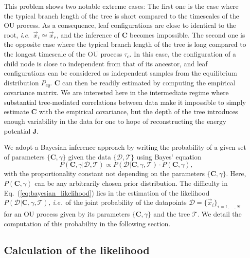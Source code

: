 \documentclass[preprint,amsmath,amssymb,superscriptaddress,showpacs,pre]{revtex4-1}
\newcommand{\ie}{\emph{i.e.}}
\def\vx{\vec x}
\begin{document}
This problem shows two notable extreme cases: 
The first one is the case where the typical branch length of the tree is short compared to the timescales of the OU process.
As a consequence, leaf configurations are close to identical to the root, \ie~$\vx_i\simeq\vx_r$, and the inference of $\bm C$ becomes impossible. 
The second one is the opposite case where the typical branch length of the tree is long compared to the longest timescale of the OU process $\tau_c$.
In this case, the configuration of a child node is close to independent from that of its ancestor, and leaf configurations can be considered as independent samples from the equilibrium distribution $P_{eq}$.
$\bm C$ can then be readily estimated by computing the empirical covariance matrix. 
We are interested here in the intermediate regime where substantial tree-mediated correlations between data
make it impossible to simply estimate $\bm C$ with the empirical covariance, but the depth of the tree introduces enough variability in the data for one to hope of reconstructing the energy potential $\bm{J}$.

We adopt a Bayesian inference approach by writing the probability of a given set of parameters $\{\bm C, \gamma\}$ given the data $\{\mathcal{D},\mathcal{T}\}$ using Bayes' equation
\begin{equation}
	P(\bm C, \gamma\vert\mathcal{D},\mathcal{T}) \propto P(\mathcal{D}\vert\bm C, \gamma,\mathcal{T})\cdot P(\bm C, \gamma),
	\label{eq:bayesian_likelihood}
\end{equation}
with the proportionality constant not depending on the parameters $\{\bm C, \gamma\}$. Here, $P(\bm C, \gamma)$ can be any arbitrarily chosen prior distribution. The difficulty in Eq.~(\ref{eq:bayesian_likelihood}) lies in the estimation of the likelihood $P(\mathcal{D}\vert\bm C, \gamma, \mathcal{T})$,
\ie~of the joint probability of the datapoints $\mathcal{D}=\{\vx_i\}_{i=1,...,N}$ for an OU process given by its parameters $\{\bm C, \gamma\}$ and the tree $\mathcal{T}$.  We detail the computation of this probability in the following section. 

\subsection{Calculation of the likelihood} %
\label{sub:Calculation_of_the_likelihood}
 
\end{document}
